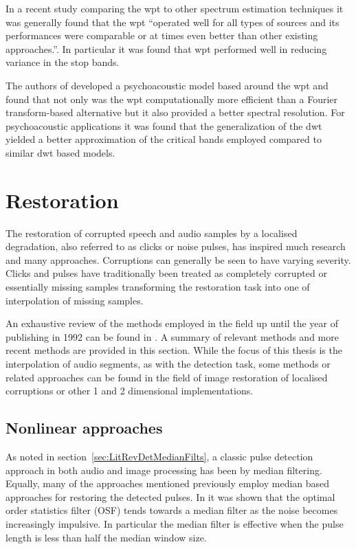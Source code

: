 In a recent study comparing the \gls{wpt} to other spectrum estimation techniques it was generally found that the \gls{wpt} ``operated well for all types of sources and its performances were comparable or at times even better than other existing \linebreak[0]approaches.''\linebreak[2]\cite{Ariananda2013}. In particular it was found that \gls{wpt} performed well in reducing variance in the stop bands.

The authors of \cite{He2008} developed a psychoacoustic model based around the \gls{wpt} and found that not only was the \gls{wpt} computationally more efficient than a Fourier transform-based alternative but it also provided a better spectral resolution. For psychoacoustic applications it was found that the generalization of the \gls{dwt} yielded a better approximation of the critical bands employed\cite{Carnero1999}\cite{He2008} compared to similar \gls{dwt} based models\cite{Sinha1993}\cite{Zurera2001}.

\section{Restoration}\label{sec:LitRev_Restoration}
The restoration of corrupted speech and audio samples by a localised degradation, also referred to as clicks or noise pulses, has inspired much research and many approaches. Corruptions can generally be seen to have varying severity. Clicks and pulses have traditionally been treated as completely corrupted or essentially missing samples transforming the restoration task into one of interpolation of missing samples\cite{Tukey1974}\cite{Tukey1977}\cite{Godsill1998book}.

An exhaustive review of the methods employed in the field up until the year of publishing in 1992 can be found in \cite{Veldhuis1992}. A summary of relevant methods and more recent methods are provided in this section. While the focus of this thesis is the interpolation of audio segments, as with the detection task, some methods or related approaches can be found in the field of image restoration of localised corruptions or other 1 and 2 dimensional implementations.

\subsection{Nonlinear approaches}\label{sec:LitRev_RestorationNonLin}
As noted in section~\ref{sec:LitRevDetMedianFilts}, a classic pulse detection approach in both audio and image processing has been by median filtering. Equally, many of the approaches mentioned previously employ median based approaches for restoring the detected pulses\cite{Tukey1974}\cite{Lee1985}\cite{Heinonen1985}\cite{Heinonen1987}\cite{Maekivirta1991}\cite{Kasparis1993}\cite{Alajlan2004}. In \cite{Bovik1983} it was shown that the optimal order statistics filter (OSF) tends towards a median filter as the noise becomes increasingly impulsive. In particular the median filter is effective when the pulse length is less than half the median window size\cite{Alajlan2004}.

